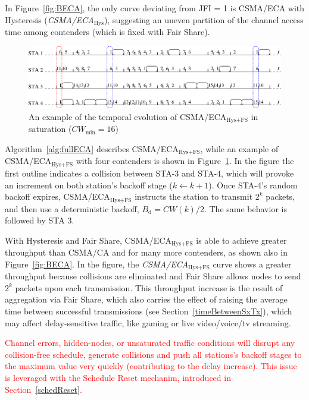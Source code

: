 	In Figure~\ref{fig:BECA}, the only curve deviating from JFI = 1 is CSMA/ECA with Hysteresis (\emph{CSMA/ECA$_{\text{Hys}}$}), suggesting an uneven partition of the channel access time among contenders (which is fixed with Fair Share).
	
	\begin{figure}[tb]
	\centering
		\includegraphics[width=0.8\linewidth]{figures/csma_eca_different_backoff_short.eps}
		\caption{An example of the temporal evolution of CSMA/ECA$_{\text{Hys+FS}}$ in saturation ($CW_{\min}=16$)}
		\label{fig:ECA+Hyst}
	\end{figure}
	
	Algorithm~\ref{alg:fullECA} describes CSMA/ECA$_{\text{Hys+FS}}$, while an example of CSMA/ECA$_{\text{Hys+FS}}$ with four contenders is shown in  Figure~\ref{fig:ECA+Hyst}. In the figure the first outline indicates a collision between STA-3 and STA-4, which will provoke an increment on both station's backoff stage ($k\leftarrow k+1$). Once STA-4's random backoff expires, CSMA/ECA$_{\text{Hys+FS}}$ instructs the station to transmit $2^{k}$ packets, and then use a deterministic backoff, $B_{\text{d}}=CW(k)/2$. The same behavior is followed by STA 3.
	
	With Hysteresis and Fair Share, CSMA/ECA$_{\text{Hys+FS}}$ is able to achieve greater throughput than CSMA/CA and for many more contenders, as shown also in Figure~\ref{fig:BECA}. In the figure, the \emph{CSMA/ECA$_{\text{Hys+FS}}$} curve shows a greater throughput because collisions are eliminated and Fair Share allows nodes to send $2^{k}$ packets upon each transmission. This throughput increase is the result of aggregation via Fair Share, which also carries the effect of raising the average time between successful transmissions (see Section~\ref{timeBetweenSxTx}), which may affect delay-sensitive traffic, like gaming or live video/voice/tv streaming. 
	
	\textcolor{red}{Channel errors, hidden-nodes, or unsaturated traffic conditions will disrupt any collision-free schedule, generate collisions and push all stations's backoff stages to the maximum value very quickly (contributing to the delay increase). This issue is leveraged with the Schedule Reset mechanim, introduced in Section~\ref{schedReset}.}

